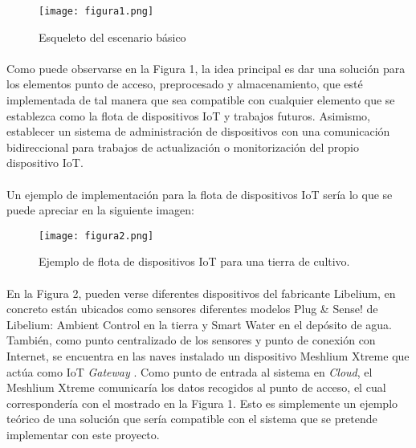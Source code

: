 \documentclass[../../memoria.tex]{subfiles}
\begin{document}
\begin{figure}[H]
    \centering
    \texttt{[image: figura1.png]}
    \caption{Esqueleto del escenario básico}
    \label{fig:figura1}
\end{figure}

\paragraph{}
Como puede observarse en la Figura 1, la idea principal es dar una solución para los elementos punto de acceso, preprocesado y almacenamiento, que esté implementada de tal manera que sea compatible con cualquier elemento que se establezca como la flota de dispositivos IoT y trabajos futuros. Asimismo, establecer un sistema de administración de dispositivos con una comunicación bidireccional para trabajos de actualización o monitorización del propio dispositivo IoT.

\paragraph{}
Un ejemplo de implementación para la flota de dispositivos IoT sería lo que se puede apreciar en la siguiente imagen:

\begin{figure}[H]
    \centering
    \texttt{[image: figura2.png]}
    \caption{Ejemplo de flota de dispositivos IoT para una tierra de cultivo.}
    \label{fig:figura2}
\end{figure}

\paragraph{}
En la Figura 2, pueden verse diferentes dispositivos del fabricante Libelium, en concreto están ubicados como sensores diferentes modelos Plug \& Sense! de Libelium: Ambient Control en la tierra y Smart Water en el depósito de agua. También, como punto centralizado de los sensores y punto de conexión con Internet, se encuentra en las naves instalado un dispositivo Meshlium Xtreme que actúa como IoT \textit{Gateway} \cite{libelium}. Como punto de entrada al sistema en \textit{Cloud}, el Meshlium Xtreme comunicaría los datos recogidos al punto de acceso, el cual correspondería con el mostrado en la Figura 1. Esto es simplemente un ejemplo teórico de una solución que sería compatible con el sistema que se pretende implementar con este proyecto.
\end{document}
